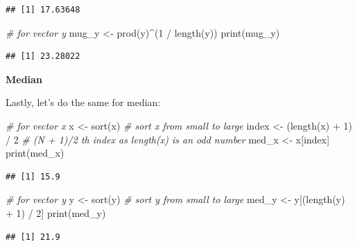\documentclass[
]{book}
\newenvironment{Shaded}{\begin{snugshade}}{\end{snugshade}}
\newcommand{\CommentTok}[1]{\textcolor[rgb]{0.56,0.35,0.01}{\textit{#1}}}
\newcommand{\DecValTok}[1]{\textcolor[rgb]{0.00,0.00,0.81}{#1}}
\newcommand{\FunctionTok}[1]{\textcolor[rgb]{0.00,0.00,0.00}{#1}}
\newcommand{\NormalTok}[1]{#1}
\newcommand{\OtherTok}[1]{\textcolor[rgb]{0.56,0.35,0.01}{#1}}
\newcommand{\SpecialCharTok}[1]{\textcolor[rgb]{0.00,0.00,0.00}{#1}}
\begin{document}
\begin{verbatim}
## [1] 17.63648
\end{verbatim}

\begin{Shaded}
\begin{Highlighting}[]
\CommentTok{\# for vector y}
\NormalTok{mug\_y }\OtherTok{\textless{}{-}} \FunctionTok{prod}\NormalTok{(y)}\SpecialCharTok{\^{}}\NormalTok{(}\DecValTok{1} \SpecialCharTok{/} \FunctionTok{length}\NormalTok{(y))}
\FunctionTok{print}\NormalTok{(mug\_y)}
\end{Highlighting}
\end{Shaded}

\begin{verbatim}
## [1] 23.28022
\end{verbatim}

\textbf{Median}

Lastly, let's do the same for median:

\begin{Shaded}
\begin{Highlighting}[]
\CommentTok{\# for vector x}
\NormalTok{x }\OtherTok{\textless{}{-}} \FunctionTok{sort}\NormalTok{(x) }\CommentTok{\# sort x from small to large}
\NormalTok{index }\OtherTok{\textless{}{-}}\NormalTok{ (}\FunctionTok{length}\NormalTok{(x) }\SpecialCharTok{+} \DecValTok{1}\NormalTok{) }\SpecialCharTok{/} \DecValTok{2} \CommentTok{\# (N + 1)/2 th index as length(x) is an odd number}
\NormalTok{med\_x }\OtherTok{\textless{}{-}}\NormalTok{ x[index]}
\FunctionTok{print}\NormalTok{(med\_x)}
\end{Highlighting}
\end{Shaded}

\begin{verbatim}
## [1] 15.9
\end{verbatim}

\begin{Shaded}
\begin{Highlighting}[]
\CommentTok{\# for vector y}
\NormalTok{y }\OtherTok{\textless{}{-}} \FunctionTok{sort}\NormalTok{(y) }\CommentTok{\# sort y from small to large}
\NormalTok{med\_y }\OtherTok{\textless{}{-}}\NormalTok{ y[(}\FunctionTok{length}\NormalTok{(y) }\SpecialCharTok{+} \DecValTok{1}\NormalTok{) }\SpecialCharTok{/} \DecValTok{2}\NormalTok{]}
\FunctionTok{print}\NormalTok{(med\_y)}
\end{Highlighting}
\end{Shaded}

\begin{verbatim}
## [1] 21.9
\end{verbatim}
\end{document}
